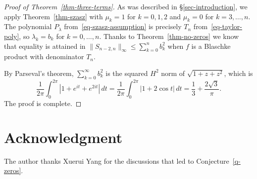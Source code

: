 \documentclass[12pt]{amsart}
\theoremstyle{definition}
\theoremstyle{remark}
\numberwithin{equation}{section}
\begin{document}
\begin{proof}[Proof of Theorem~\ref{thm-three-terms}] As was described in \S\ref{sec-introduction}, we apply 
Theorem~\ref{thm-szasz} with $\mu_k=1$ for $k=0,1,2$ and $\mu_k=0$ for $k=3,\dots,n$. The polynomial $P_\lambda$ from~\eqref{eq-szasz-assumption} is precisely $T_n$ from~\eqref{eq-taylor-poly}, so $\lambda_k=b_k$ for $k=0,\dots, n$.  Thanks to Theorem~\ref{thm-no-zeros} we know that equality is attained in $\|S_{n-2,n}\|_\infty \le \sum_{k=0}^n b_k^2$ when $f$ is a Blaschke product with denominator $T_n$. 

By Parseval's theorem,   
$\sum_{k=0}^\infty b_k^2$ is the squared $H^2$ norm of $\sqrt{1+z+z^2}$, which is 
\[
\frac{1}{2\pi} \int_0^{2\pi} |1+e^{it}+e^{2it}|\,dt
= \frac{1}{2\pi} \int_0^{2\pi} |1+2\cos t|\,dt  
=\frac{1}{3} + \frac{2\sqrt{3}}{\pi}.
\]
The proof is complete. 
\end{proof}

 
\section*{Acknowledgment}

The author thanks Xuerui Yang for the discussions that led to Conjecture~\ref{q-zeros}.  

 
 
\end{document}
